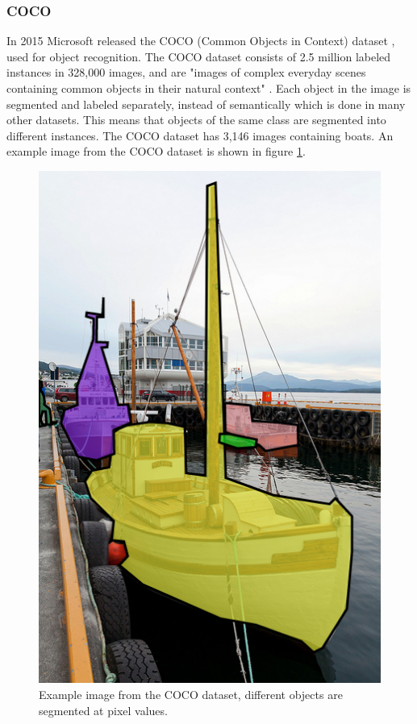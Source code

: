 \clearpage

\subsubsection{COCO}
In 2015 Microsoft released the COCO (Common Objects in Context) dataset \citep{Lin2014}, used for object recognition. The COCO dataset consists of 2.5 million labeled instances in 328,000 images, and are "images of complex everyday scenes containing common objects in their natural context" \citep{Lin2014}. Each object in the image is segmented and labeled separately, instead of semantically which is done in many other datasets. This means that objects of the same class are segmented into different instances. The COCO dataset has 3,146 images containing boats. An example image from the COCO dataset is shown in figure \ref{fig:coco}.

\begin{figure}[h!]
    \centering
    \includegraphics[scale=0.4]{images/coco.png}
    \caption{Example image from the COCO dataset, different objects are segmented at pixel values.}
    \label{fig:coco}
\end{figure}

